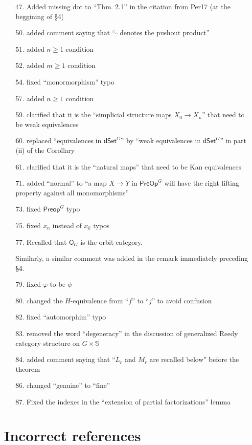 \documentclass{article}
\begin{document}
\begin{itemize}
\item[47.] Added missing dot to ``Thm. 2.1'' in the citation from Per17 (at the beggining of \S 4)
\item[50.] added comment saying that ``$\square$ denotes the pushout product''
\item[51.] added $n \geq 1$ condition
\item[52.] added $m \geq 1$ condition
\item[54.] fixed ``monormorphism'' typo
\item[57.] added $n \geq 1$ condition
\item[59.] clarified that it is the ``simplicial structure maps $X_0 \to X_n$'' that need to be weak equivalences
\item[60.] replaced ``equivalences in $\mathsf{dSet}^G$'' by ``weak equivalences in $\mathsf{dSet}^G$'' in part (ii) of the Corollary
\item[61.] clarified that it is the ``natural maps'' that need to be Kan equivalences
\item[71.] added ``normal'' to ``a map $X\to Y$ in $\mathsf{PreOp}^G$ will have the right lifting property against all monomorphisms''
\item[73.] fixed $\mathsf{Preop}^G$ typo
\item[75.] fixed $x_n$ instead of $x_k$ typos
\item[77.] Recalled that $\mathsf{O}_G$ is the orbit category.

Similarly, a similar comment was added in the remark immediately preceding \S 4.
\item[79.] fixed $\varphi$ to be $\psi$
\item[80.] changed the $H$-equivalence from ``$f$'' to ``$j$'' to avoid confusion
\item[82.] fixed ``automorphim'' typo
\item[83.] removed the word ``degeneracy'' in the discussion of generalized Reedy category structure on $G \times \mathbb{S}$
\item[84.] added comment saying that ``$L_r$ and $M_r$ are recalled below'' before the theorem
\item[86.] changed ``genuine'' to ``fine''
\item[87.] Fixed the indexes in the ``extension of partial factorizations'' lemma
\end{itemize}




\section{Incorrect references}
\end{document}
